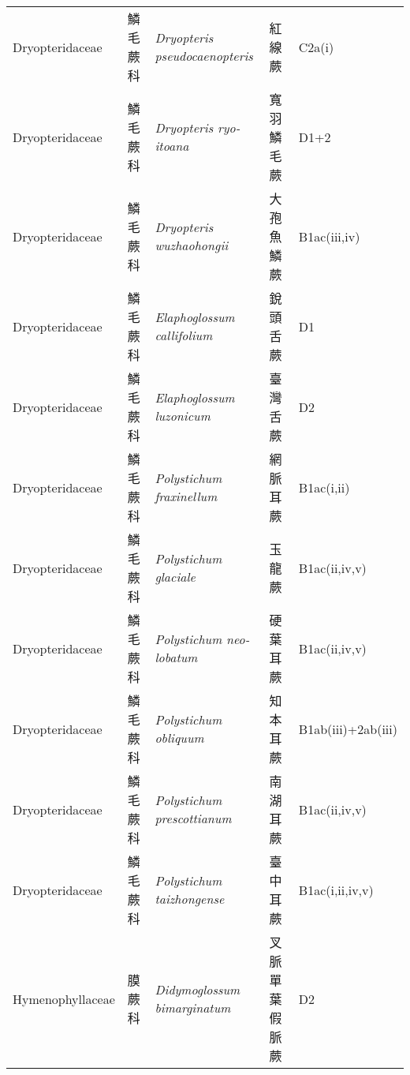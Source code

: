 {\begin{longtable}{p{2.5cm}p{2.5cm}p{4.5cm}p{2.5cm}p{3cm}}
    Dryopteridaceae & 鱗毛蕨科 & \textit{Dryopteris pseudocaenopteris}  & 紅線蕨 & C2a(i) \index{Dryopteris@\textit{Dryopteris}!pseudocaenopteris@\textit{pseudocaenopteris}}  \index{紅線蕨} \\
    Dryopteridaceae & 鱗毛蕨科 & \textit{Dryopteris ryo-itoana}  & 寬羽鱗毛蕨 & D1+2 \index{Dryopteris@\textit{Dryopteris}!ryo-itoana@\textit{ryo-itoana}}  \index{寬羽鱗毛蕨} \\
    Dryopteridaceae & 鱗毛蕨科 & \textit{Dryopteris wuzhaohongii}  & 大孢魚鱗蕨 & B1ac(iii,iv) \index{Dryopteris@\textit{Dryopteris}!wuzhaohongii@\textit{wuzhaohongii}}  \index{大孢魚鱗蕨} \\
    Dryopteridaceae & 鱗毛蕨科 & \textit{Elaphoglossum callifolium}  & 銳頭舌蕨 & D1 \index{Elaphoglossum@\textit{Elaphoglossum}!callifolium@\textit{callifolium}}  \index{銳頭舌蕨} \\
    Dryopteridaceae & 鱗毛蕨科 & \textit{Elaphoglossum luzonicum}  & 臺灣舌蕨 & D2 \index{Elaphoglossum@\textit{Elaphoglossum}!luzonicum@\textit{luzonicum}}  \index{臺灣舌蕨} \\
    Dryopteridaceae & 鱗毛蕨科 & \textit{Polystichum fraxinellum}  & 網脈耳蕨 & B1ac(i,ii) \index{Polystichum@\textit{Polystichum}!fraxinellum@\textit{fraxinellum}}  \index{網脈耳蕨} \\
    Dryopteridaceae & 鱗毛蕨科 & \textit{Polystichum glaciale}  & 玉龍蕨 & B1ac(ii,iv,v) \index{Polystichum@\textit{Polystichum}!glaciale@\textit{glaciale}}  \index{玉龍蕨} \\
    Dryopteridaceae & 鱗毛蕨科 & \textit{Polystichum neo-lobatum}  & 硬葉耳蕨 & B1ac(ii,iv,v) \index{Polystichum@\textit{Polystichum}!neo-lobatum@\textit{neo-lobatum}}  \index{硬葉耳蕨} \\
    Dryopteridaceae & 鱗毛蕨科 & \textit{Polystichum obliquum}  & 知本耳蕨 & B1ab(iii)+2ab(iii) \index{Polystichum@\textit{Polystichum}!obliquum@\textit{obliquum}}  \index{知本耳蕨} \\
    Dryopteridaceae & 鱗毛蕨科 & \textit{Polystichum prescottianum}  & 南湖耳蕨 & B1ac(ii,iv,v) \index{Polystichum@\textit{Polystichum}!prescottianum@\textit{prescottianum}}  \index{南湖耳蕨} \\
    Dryopteridaceae & 鱗毛蕨科 & \textit{Polystichum taizhongense}  & 臺中耳蕨 & B1ac(i,ii,iv,v) \index{Polystichum@\textit{Polystichum}!taizhongense@\textit{taizhongense}}  \index{臺中耳蕨} \\
    Hymenophyllaceae & 膜蕨科 & \textit{Didymoglossum bimarginatum}  & 叉脈單葉假脈蕨 & D2 \index{Didymoglossum@\textit{Didymoglossum}!bimarginatum@\textit{bimarginatum}}  \index{叉脈單葉假脈蕨} \\

\end{longtable}}
